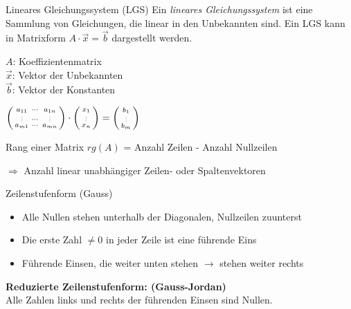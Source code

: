         \begin{definition}{Lineares Gleichungssystem (LGS)}
            Ein \textit{lineares Gleichungssystem} ist eine Sammlung von Gleichungen, 
            die linear in den Unbekannten sind. 
            Ein LGS kann in Matrixform $A\cdot\vec{x}=\vec{b}$ dargestellt werden.\\
            \begin{minipage}
                {0.45\linewidth}
                {\small
                $A$: Koeffizientenmatrix\\
                $\vec{x}$: Vektor der Unbekannten\\
                $\vec{b}$: Vektor der Konstanten}
            \end{minipage}
            \begin{minipage}{0.55\linewidth}
                $\begin{psmallmatrix} a_{11} & \cdots & a_{1n} \\ \scalebox{0.5}{\vdots} & \cdots & \scalebox{0.5}{\vdots} \\ a_{m1} & \cdots & a_{mn} \end{psmallmatrix} \cdot \begin{psmallmatrix}
                    x_1 \\ \scalebox{0.5}{\vdots} \\ x_n
                \end{psmallmatrix} = \begin{psmallmatrix}
                    b_1 \\ \scalebox{0.5}{\vdots} \\ b_m
                \end{psmallmatrix}$
            \end{minipage}
        \end{definition}

    
        \begin{theorem}{Rang einer Matrix} $rg(A)$ = Anzahl Zeilen - Anzahl Nullzeilen
            
            $\Rightarrow$ Anzahl linear unabhängiger Zeilen- oder Spaltenvektoren
        \end{theorem}


\begin{concept}{Zeilenstufenform (Gauss)}
    \begin{itemize}
        \item Alle Nullen stehen unterhalb der Diagonalen, Nullzeilen zuunterst
        \item Die erste Zahl $\neq 0$ in jeder Zeile ist eine führende Eins
        \item Führende Einsen, die weiter unten stehen $\rightarrow$ stehen weiter rechts
    \end{itemize}
    \textbf{Reduzierte Zeilenstufenform: (Gauss-Jordan)}\\
    Alle Zahlen links und rechts der führenden Einsen sind Nullen.
\end{concept}
    
